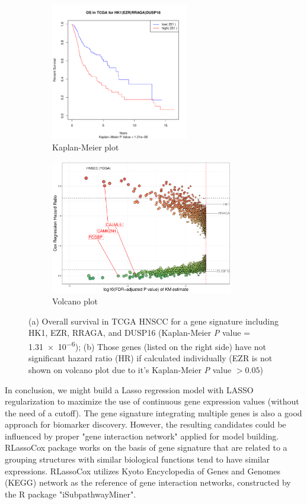\documentclass[preprint,12pt]{elsarticle}
\newenvironment{MyColorPar}[1]{%
    \leavevmode\color{#1}\ignorespaces%
}{%
}%
\begin{document}
\begin{MyColorPar}{blue}
\begin{figure}[ht]
  \begin{subfigure}[b]{0.3\textwidth}
    \includegraphics[width=6cm]{rplot_KMplot_HK1.pdf}
    \caption{Kaplan-Meier plot}
  \end{subfigure}
  \hfill
  \begin{subfigure}[b]{0.5\textwidth}
    \includegraphics[width=8cm]{Rplot_TCGA_HNSCC_CoxHR_CAMK2N1_signature4_FDRKM.pdf}  
    \caption{Volcano plot}
  \end{subfigure}
  \caption{(a) Overall survival in TCGA HNSCC for a gene signature including HK1, EZR, RRAGA, and DUSP16 (Kaplan-Meier \textit{P} value = \num{1.31e-6}); (b) Those genes (listed on the right side) have not significant hazard ratio (HR) if calculated individually (EZR is not shown on volcano plot due to it's Kaplan-Meier \textit{P} value $>0.05$)}
    \label{fig:signature4}
\end{figure}



In conclusion, we might build a Lasso regression model with LASSO regularization to maximize the use of continuous gene expression values (without the need of a cutoff).
The gene signature integrating multiple genes is also a good approach for biomarker discovery.
However, the resulting candidates could be influenced by proper "gene interaction network" applied for model building.
RLassoCox package works on the basis of gene signature that are related to a grouping structures with similar biological functions tend to have similar expressions. 
RLassoCox utilizes Kyoto Encyclopedia of Genes and Genomes (KEGG) network\cite{Simon2011} as the reference of gene interaction networks, constructed by the R package "iSubpathwayMiner".


\end{MyColorPar}
\end{document}
